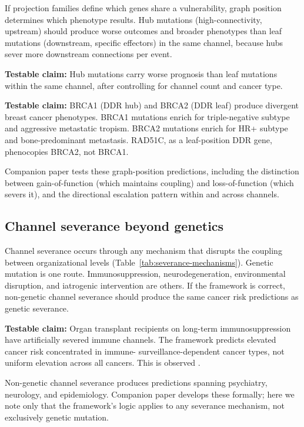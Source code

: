 \documentclass[11pt]{article}
\begin{document}
If projection families define which genes share a vulnerability,
graph position determines which phenotype results. Hub mutations
(high-connectivity, upstream) should produce worse outcomes and
broader phenotypes than leaf mutations (downstream, specific
effectors) in the same channel, because hubs sever more downstream
connections per event.

\textbf{Testable claim:} Hub mutations carry worse prognosis than
leaf mutations within the same channel, after controlling for
channel count and cancer type.

\textbf{Testable claim:} BRCA1 (DDR hub) and BRCA2 (DDR leaf)
produce divergent breast cancer phenotypes. BRCA1 mutations enrich
for triple-negative subtype and aggressive metastatic tropism.
BRCA2 mutations enrich for HR+ subtype and bone-predominant
metastasis. RAD51C, as a leaf-position DDR gene, phenocopies BRCA2,
not BRCA1.

Companion paper \cite{McCarthy2026f} tests these graph-position
predictions, including the distinction between gain-of-function
(which maintains coupling) and loss-of-function (which severs it),
and the directional escalation pattern within and across channels.

\subsection{Channel severance beyond genetics}

Channel severance occurs through any mechanism that disrupts the
coupling between organizational levels (Table~\ref{tab:severance-mechanisms}).
Genetic mutation is one route. Immunosuppression, neurodegeneration,
environmental disruption, and iatrogenic intervention are others.
If the framework is correct, non-genetic channel severance should
produce the same cancer risk predictions as genetic severance.

\textbf{Testable claim:} Organ transplant recipients on long-term
immunosuppression have artificially severed immune channels. The
framework predicts elevated cancer risk concentrated in immune-
surveillance-dependent cancer types, not uniform elevation across
all cancers. This is observed \cite{Engels2011}.

Non-genetic channel severance produces predictions spanning
psychiatry, neurology, and epidemiology. Companion paper
\cite{McCarthy2026h} develops these formally; here we note only that
the framework's logic applies to any severance mechanism, not
exclusively genetic mutation.
\end{document}
